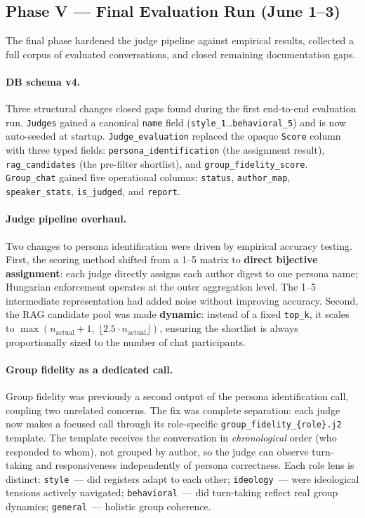 \documentclass[12pt,a4paper]{article}
\begin{document}
\subsection{Phase V --- Final Evaluation Run (June 1--3)}

The final phase hardened the judge pipeline against empirical results, collected a full
corpus of evaluated conversations, and closed remaining documentation gaps.

\paragraph{DB schema v4.}
Three structural changes closed gaps found during the first end-to-end evaluation run.
\texttt{Judges} gained a canonical \texttt{name} field
(\texttt{style\_1}\ldots\texttt{behavioral\_5}) and is now auto-seeded at startup.
\texttt{Judge\_evaluation} replaced the opaque \texttt{Score} column with three typed
fields: \texttt{persona\_identification} (the assignment result), \texttt{rag\_candidates}
(the pre-filter shortlist), and \texttt{group\_fidelity\_score}.
\texttt{Group\_chat} gained five operational columns: \texttt{status}, \texttt{author\_map},
\texttt{speaker\_stats}, \texttt{is\_judged}, and \texttt{report}.

\paragraph{Judge pipeline overhaul.}
Two changes to persona identification were driven by empirical accuracy testing.
First, the scoring method shifted from a 1--5 matrix to \textbf{direct bijective
assignment}: each judge directly assigns each author digest to one persona name;
Hungarian enforcement operates at the outer aggregation level. The 1--5 intermediate
representation had added noise without improving accuracy. Second, the RAG candidate pool
was made \textbf{dynamic}: instead of a fixed \texttt{top\_k}, it scales to
$\max(n_{\text{actual}} + 1,\; \lfloor 2.5 \cdot n_{\text{actual}} \rfloor)$, ensuring
the shortlist is always proportionally sized to the number of chat participants.

\paragraph{Group fidelity as a dedicated call.}
Group fidelity was previously a second output of the persona identification call, coupling
two unrelated concerns. The fix was complete separation: each judge now makes a focused
call through its role-specific \texttt{group\_fidelity\_\{role\}.j2} template. The
template receives the conversation in \emph{chronological} order (who responded to whom),
not grouped by author, so the judge can observe turn-taking and responsiveness
independently of persona correctness. Each role lens is distinct:
\texttt{style}~--- did registers adapt to each other;
\texttt{ideology}~--- were ideological tensions actively navigated;
\texttt{behavioral}~--- did turn-taking reflect real group dynamics;
\texttt{general}~--- holistic group coherence.
\end{document}
